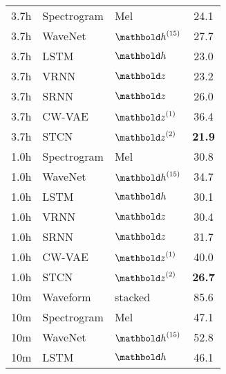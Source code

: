 {\begin{table}[t]
\begin{subtable}[t]{.45\textwidth}
\begin{adjustbox}{center, totalheight=0.35\paperheight}
\begin{tabular}[t]{cll|c}
        3.7h   &  Spectrogram     & Mel           &   24.1   \\  %
        3.7h   &  WaveNet         & $\hb^{(15)}$  &   27.7   \\  %
        3.7h   &  LSTM            & $\hb$         &   23.0   \\  %
        3.7h   &  VRNN            & $\zb$         &   23.2   \\  %
        3.7h   &  SRNN            & $\zb$         &   26.0   \\  %
        3.7h   &  CW-VAE          & $\zb^{(1)}$   &   36.4   \\  %
        3.7h   &  STCN            & $\zb^{(2)}$   &   \textbf{21.9}   \\  %
        \midrule
        1.0h   &  Spectrogram     & Mel           &   30.8   \\  %
        1.0h   &  WaveNet         & $\hb^{(15)}$  &   34.7   \\  %
        1.0h   &  LSTM            & $\hb$         &   30.1   \\  %
        1.0h   &  VRNN            & $\zb$         &   30.4   \\  %
        1.0h   &  SRNN            & $\zb$         &   31.7   \\  %
        1.0h   &  CW-VAE          & $\zb^{(1)}$   &   40.0   \\  %
        1.0h   &  STCN            & $\zb^{(2)}$   &   \textbf{26.7}   \\  %
        \midrule
        10m    &  Waveform        & stacked       &   85.6   \\  %
        10m    &  Spectrogram     & Mel           &   47.1   \\  %
        10m    &  WaveNet         & $\hb^{(15)}$  &   52.8   \\  %
        10m    &  LSTM            & $\hb$         &   46.1   \\  %

\end{tabular}
\end{adjustbox}
\end{subtable}
\end{table}}
